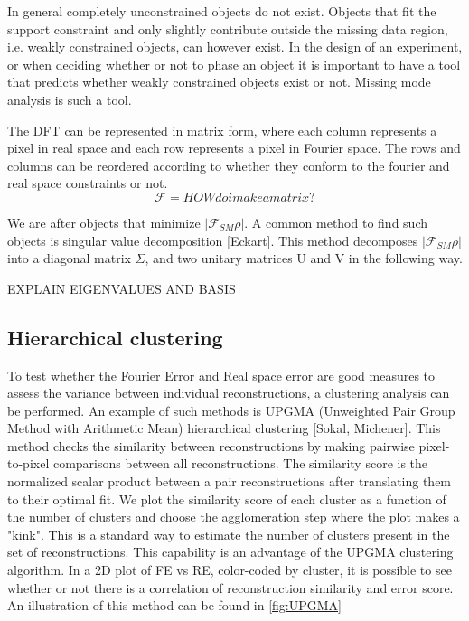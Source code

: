 In general completely unconstrained objects do not exist. Objects that fit the support constraint and only slightly contribute outside the missing data region, i.e. weakly constrained objects, can however exist. In the design of an experiment, or when deciding whether or not to phase an object it is important to have a tool that predicts whether weakly constrained objects exist or not. Missing mode analysis is such a tool.

The DFT can be represented in matrix form, where each column represents a pixel in real space and each row represents a pixel in Fourier space. The rows and columns can be reordered according to whether they conform to the fourier and real space constraints or not.
\begin{equation}
\mathcal{F} = {HOW do i make a matrix?}
\end{equation}
 
We are after objects that minimize $|\mathcal{F}_{SM}\rho|$. A common method to find such objects is singular value decomposition [Eckart]. This method decomposes $|\mathcal{F}_{SM}\rho|$ into a diagonal matrix $\Sigma$, and two unitary matrices U and V in the following way.

EXPLAIN EIGENVALUES AND BASIS




\subsection{Hierarchical clustering}
To test whether the Fourier Error and Real space error are good measures to assess the variance between individual reconstructions, a clustering analysis can be performed. An example of such methods is UPGMA (Unweighted Pair Group Method with Arithmetic Mean) hierarchical clustering [Sokal, Michener]. This method checks the similarity between reconstructions by making pairwise pixel-to-pixel comparisons between all reconstructions. The similarity score is the normalized scalar product between a pair reconstructions after translating them to their optimal fit. We plot the similarity score of  each cluster as a function of the number of clusters and choose the agglomeration step where the plot makes a "kink". This is a standard way to estimate the number of clusters present in the set of reconstructions. This capability is an advantage of the UPGMA clustering algorithm. In a 2D plot of FE vs RE, color-coded by cluster, it is possible to see whether or not there is a correlation of reconstruction similarity and error score. An illustration of this method can be found in \ref{fig:UPGMA}
 
